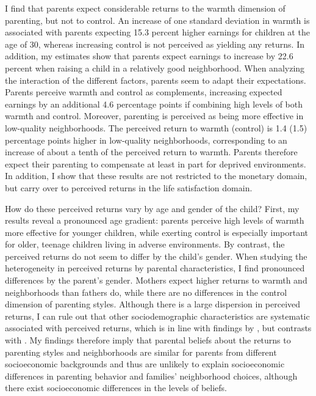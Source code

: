\documentclass[12pt, a4paper, english]{article}
\begin{document}
I find that parents expect considerable returns to the warmth dimension of parenting, but not to control. An increase of one standard deviation in warmth is associated with parents expecting 15.3 percent higher earnings for children at the age of 30, whereas increasing control is not perceived as yielding any returns. In addition, my estimates show that parents expect earnings to increase by 22.6 percent when raising a child in a relatively good neighborhood. When analyzing the interaction of the different factors, parents seem to adapt their expectations. Parents perceive warmth and control as complements, increasing expected earnings by an additional 4.6 percentage points if combining high levels of both warmth and control. Moreover, parenting is perceived as being more effective in low-quality neighborhoods. The perceived return to warmth (control) is 1.4 (1.5) percentage points higher in low-quality neighborhoods, corresponding to an increase of about a tenth of the perceived return to warmth. Parents therefore expect their parenting to compensate at least in part for deprived environments. In addition, I show that these results are not restricted to the monetary domain, but carry over to perceived returns in the life satisfaction domain.

How do these perceived returns vary by age and gender of the child? First, my results reveal a pronounced age gradient: parents perceive high levels of warmth more effective for younger children, while exerting control is especially important for older, teenage children living in adverse environments. By contrast, the perceived returns do not seem to differ by the child's gender. When studying the heterogeneity in perceived returns by parental characteristics, I find pronounced differences by the parent's gender. Mothers expect higher returns to warmth and neighborhoods than fathers do, while there are no differences in the control dimension of parenting styles. Although there is a large dispersion in perceived returns, I can rule out that other sociodemographic characteristics are systematic associated with perceived returns, which is in line with findings by \citet{Attanasioetal2018}, but contrasts with \citet{BonevaRauh2018}. My findings therefore imply that parental beliefs about the returns to parenting styles and neighborhoods are similar for parents from different socioeconomic backgrounds and thus are unlikely to explain socioeconomic differences in parenting behavior and families' neighborhood choices, although there exist socioeconomic differences in the levels of beliefs.
\end{document}

